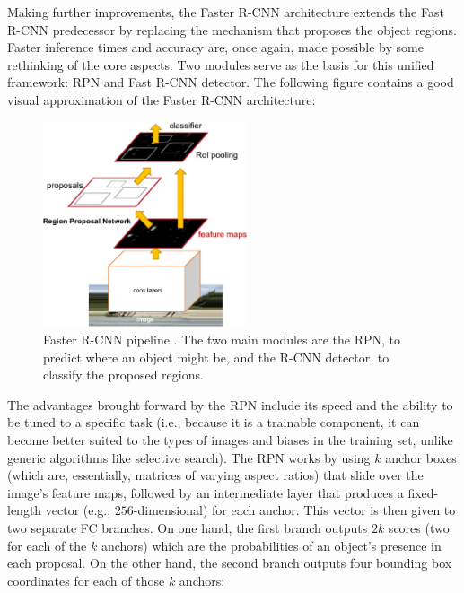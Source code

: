 Making further improvements, the Faster \ac{R-CNN} \cite{faster_r_cnn} architecture extends the Fast \ac{R-CNN} predecessor by replacing the mechanism that proposes the object regions. Faster inference times and accuracy are, once again, made possible by some rethinking of the core aspects. Two modules serve as the basis for this unified framework: \ac{RPN} and Fast \ac{R-CNN} detector. The following figure contains a good visual approximation of the Faster \ac{R-CNN} architecture:

\begin{figure}[h]
\centering
\includegraphics[width=170pt]{figures/figure_7.pdf}
\caption{Faster \ac{R-CNN} pipeline \cite{faster_r_cnn}. The two main modules are the \ac{RPN}, to predict where an object might be, and the \ac{R-CNN} detector, to classify the proposed regions.}
\label{fig:faster_r_cnn}
\end{figure}

The advantages brought forward by the \ac{RPN} include its speed and the  ability to be tuned to a specific task (i.e., because it is a trainable component, it can become better suited to the types of images and biases in the training set, unlike generic algorithms like selective search). The \ac{RPN} works by using $k$ anchor boxes (which are, essentially, matrices of varying aspect ratios) that slide over the image's feature maps, followed by an intermediate layer that produces a fixed-length vector (e.g., $256$-dimensional) for each anchor. This vector is then given to two separate \ac{FC} branches. On one hand, the first branch outputs $2k$ scores (two for each of the $k$ anchors) which are the probabilities of an object's presence in each proposal. On the other hand, the second branch outputs four bounding box coordinates for each of those $k$ anchors: 

